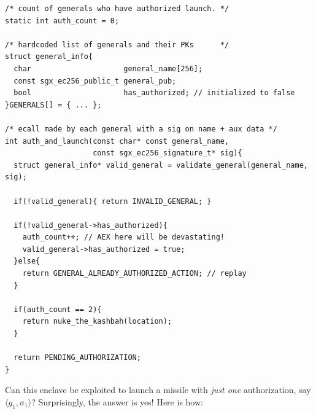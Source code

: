 \documentclass[10pt]{article}
\begin{document}
  \begin{center}
  \begin{lstlisting}[captionpos=b,
                     caption={An enclave suseptible to state malleability},
                     label=code:malleability]
/* count of generals who have authorized launch. */
static int auth_count = 0;

/* hardcoded list of generals and their PKs      */
struct general_info{
  char                     general_name[256];
  const sgx_ec256_public_t general_pub;
  bool                     has_authorized; // initialized to false
}GENERALS[] = { ... };

/* ecall made by each general with a sig on name + aux data */
int auth_and_launch(const char* const general_name,
                    const sgx_ec256_signature_t* sig){
  struct general_info* valid_general = validate_general(general_name, sig);

  if(!valid_general){ return INVALID_GENERAL; }

  if(!valid_general->has_authorized){
    auth_count++; // AEX here will be devastating!
    valid_general->has_authorized = true;
  }else{
    return GENERAL_ALREADY_AUTHORIZED_ACTION; // replay
  }

  if(auth_count == 2){
    return nuke_the_kashbah(location);
  }

  return PENDING_AUTHORIZATION;
}
\end{lstlisting}
\end{center}

  Can this enclave be exploited to launch a missile with \textit{just
    one} authorization, say $\langle g_1, \sigma_1 \rangle$?
  Surprisingly, the answer is yes! Here is how:
\end{document}
